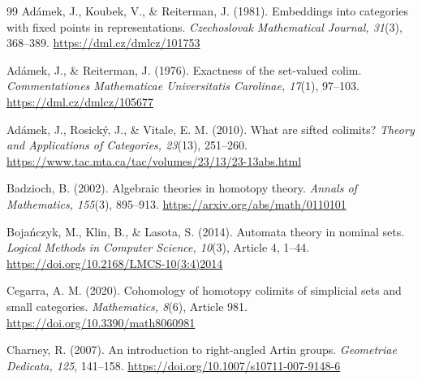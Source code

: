 \documentclass[11pt,a4paper]{article}
\theoremstyle{definition}
\begin{document}
\begin{thebibliography}{99}
Ad\'amek, J., Koubek, V., \& Reiterman, J. (1981).
Embeddings into categories with fixed points in representations.
\emph{Czechoslovak Mathematical Journal, 31}(3), 368--389.
\url{https://dml.cz/dmlcz/101753}
\par{}

Ad\'amek, J., \& Reiterman, J. (1976).
Exactness of the set-valued colim.
\emph{Commentationes Mathematicae Universitatis Carolinae, 17}(1), 97--103.
\url{https://dml.cz/dmlcz/105677}
\par{}

Ad\'amek, J., Rosick\'y, J., \& Vitale, E. M. (2010).
What are sifted colimits?
\emph{Theory and Applications of Categories, 23}(13), 251--260.
\url{https://www.tac.mta.ca/tac/volumes/23/13/23-13abs.html}
\par{}

Badzioch, B. (2002). Algebraic theories in homotopy theory.
\emph{Annals of Mathematics, 155}(3), 895--913.
\url{https://arxiv.org/abs/math/0110101}
\par{}

Boja\'nczyk, M., Klin, B., \& Lasota, S. (2014).
Automata theory in nominal sets.
\emph{Logical Methods in Computer Science, 10}(3), Article 4, 1--44.
\url{https://doi.org/10.2168/LMCS-10(3:4)2014}
\par{}

Cegarra, A. M. (2020).
Cohomology of homotopy colimits of simplicial sets and small categories.
\emph{Mathematics, 8}(6), Article 981.
\url{https://doi.org/10.3390/math8060981}
\par{}

Charney, R. (2007). An introduction to right-angled Artin groups.
\emph{Geometriae Dedicata, 125}, 141--158.
\url{https://doi.org/10.1007/s10711-007-9148-6}
\par{}


\end{thebibliography}
\end{document}
